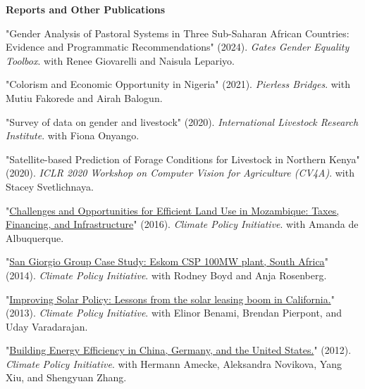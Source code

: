 \documentclass[11pt,letterpaper]{article}
\newcommand{\horse}{5pt} 	%
\newcommand{\littlehorse}{5pt}%
\newenvironment{itemize*}%
  {\begin{itemize}[topsep=0pt, partopsep=0pt, leftmargin=1.6em, itemindent=-1.6em, labelsep=0pt, labelwidth=0pt]%
    \setlength{\itemsep}{\littlehorse}%
    \setlength{\parskip}{0pt}%
    \interlinepenalty=10000}%
  {\end{itemize}\vspace{\horse}}
\newcommand{\resheading}[1]{%
  \vspace{6pt}%
  {\textbf{\large #1}}%
  \par\vspace{4pt}}
\begin{document}
\resheading{Reports and Other Publications}
\begin{itemize*}

  \item[]{"Gender Analysis of Pastoral Systems in Three Sub-Saharan African Countries: Evidence and Programmatic Recommendations" (2024). \textit{Gates Gender Equality Toolbox}. with Renee Giovarelli and Naisula Lepariyo.}

  \item[]{"Colorism and Economic Opportunity in Nigeria" (2021).  \textit{Pierless Bridges}. with Mutiu Fakorede and Airah Balogun.}

  \item[]{"Survey of data on gender and livestock" (2020). \textit{International Livestock Research Institute}. with Fiona Onyango.}

  \item[]{"Satellite-based Prediction of Forage Conditions for Livestock in Northern Kenya" (2020).  \textit{ICLR 2020 Workshop on Computer Vision for Agriculture (CV4A)}. with Stacey Svetlichnaya.}

  \item[]{"\href{http://climatepolicyinitiative.org/publication/challenges-opportunities-efficient-land-use-mozambique-taxes-financing-infrastructure/}{Challenges and Opportunities for Efficient Land Use in Mozambique: Taxes, Financing, and Infrastructure}"  (2016). \textit{Climate Policy Initiative}. with Amanda de Albuquerque.}

  \item[]{"\href{https://www.climatepolicyinitiative.org/publication/san-giorgio-group-case-study-eskom-csp-100mw-plant-south-africa/}{San Giorgio Group Case Study: Eskom CSP 100MW plant, South Africa}" (2014). \textit{Climate Policy Initiative}. with Rodney Boyd and Anja Rosenberg.}


  \item[]{"\href{http://climatepolicyinitiative.org/publication/improving-solar-policy-lessons-from-the-solar-leasing-boom-in-california/}{Improving Solar Policy: Lessons from the solar leasing boom in California.}"  (2013). \textit{Climate Policy Initiative}. with Elinor Benami, Brendan Pierpont, and Uday Varadarajan.}

  \item[]{"\href{http://climatepolicyinitiative.org/publication/buildings-energy-efficiency-in-china-germany-and-the-united-states/}{Building Energy Efficiency in China, Germany, and the United States.}"  (2012). \textit{Climate Policy Initiative}. with Hermann Amecke, Aleksandra Novikova, Yang Xiu, and Shengyuan Zhang.}


\end{itemize*}
\end{document}
